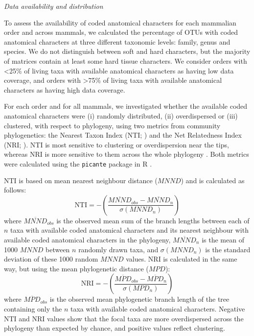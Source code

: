 \documentclass[12pt,letterpaper]{article}
\renewcommand{\subsection}[1]{%
\bigskip
\begin{center}
\begin{large}
\normalfont\itshape #1
\end{large}
\end{center}}
\begin{document}
\subsection{Data availability and distribution}
To assess the availability of coded anatomical characters for each mammalian order and across mammals, we calculated the percentage of OTUs with coded anatomical characters at three different taxonomic levels: family, genus and species.
We do not distinguish between soft and hard characters, but the majority of matrices contain at least some hard tissue characters. %
We consider orders with \textless 25\% of living taxa with available anatomical characters as having low data coverage, and orders with \textgreater 75\% of living taxa with available anatomical characters as having high data coverage. 

For each order and for all mammals, we investigated whether the available coded anatomical characters were (i) randomly distributed, (ii) overdispersed or (iii) clustered, with respect to phylogeny, using two metrics from community phylogenetics: the Nearest Taxon Index (NTI; \cite{webb2002phylogenies}) and the Net Relatedness Index (NRI; \cite{webb2002phylogenies}). 
NTI is most sensitive to clustering or overdispersion near the tips, whereas NRI is more sensitive to them across the whole phylogeny \cite{Cooper2008}. 
Both metrics were calculated using the \texttt{picante} package in R \cite{picante,R}.

NTI \cite{webb2002phylogenies} is based on mean nearest neighbour distance ($MNND$) and is calculated as follows:
  \begin{equation}
    \text{NTI}=-\left(\frac{\overline{MNND}_{obs}-\overline{MNND}_{n}}{\sigma(MNND_{n})}\right)
  \end{equation}
where $\overline{MNND}_{obs}$ is the observed mean sum of the branch lengths between each of $n$ taxa with available coded anatomical characters and its nearest neighbour with available coded anatomical characters in the phylogeny, 
$\overline{MNND}_{n}$ is the mean of 1000 $MNND$ between $n$ randomly drawn taxa, and $\sigma(MNND_{n})$ is the standard deviation of these 1000 random $MNND$ values.
NRI is calculated in the same way, but using the mean phylogenetic distance ($MPD$):
  \begin{equation}
    \text{NRI}=-\left(\frac{\overline{MPD}_{obs}-\overline{MPD}_{n}}{\sigma(MPD_{n})}\right)
  \end{equation}
where $\overline{MPD}_{obs}$ is the observed mean phylogenetic branch length of the tree containing only the $n$ taxa with available coded anatomical characters.
Negative NTI and NRI values show that the focal taxa are more overdispersed across the phylogeny than expected by chance, and positive values reflect clustering.
\end{document}
